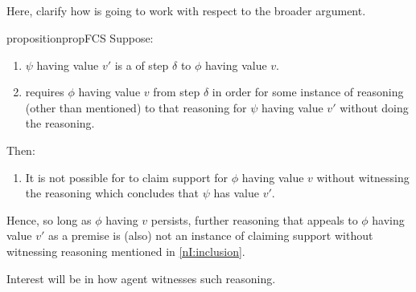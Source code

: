 \subsection{\FCS{}}
\label{sec:fcs-2}

\begin{note}
  \color{red}
  Here, clarify how \ideaCS{} is going to work with respect to the broader argument.
\end{note}

\begin{note}
  \begin{restatable}{proposition}{propFCS}
    \label{prop:fcs}
    Suppose:

    \begin{enumerate}
    \item
      \(\psi\) having value \(v'\) is a \crequ{} of step \(\delta\) to \(\phi\) having value \(v\).
    \item
      \vAgent{} requires \(\phi\) having value \(v\) from step \(\delta\)
      in order for some instance of reasoning (other than mentioned) to \indicateN{} that reasoning for \(\psi\) having value \(v'\) without doing the reasoning.
    \end{enumerate}

    Then:
    \begin{enumerate}[resume]
    \item
      It is not possible for \vAgent{} to claim support for \(\phi\) having value \(v\) without witnessing the reasoning which concludes that \(\psi\) has value \(v'\).
    \end{enumerate}
    \vspace{-\baselineskip}
  \end{restatable}

  Hence, so long as \(\phi\) having \(v\) persists, further reasoning that appeals to \(\phi\) having value \(v'\) as a premise is (also) not an instance of claiming support without witnessing reasoning mentioned in \ref{nI:inclusion}.

  {
    \color{red}
    Interest will be in how agent witnesses such reasoning.
  }
\end{note}

